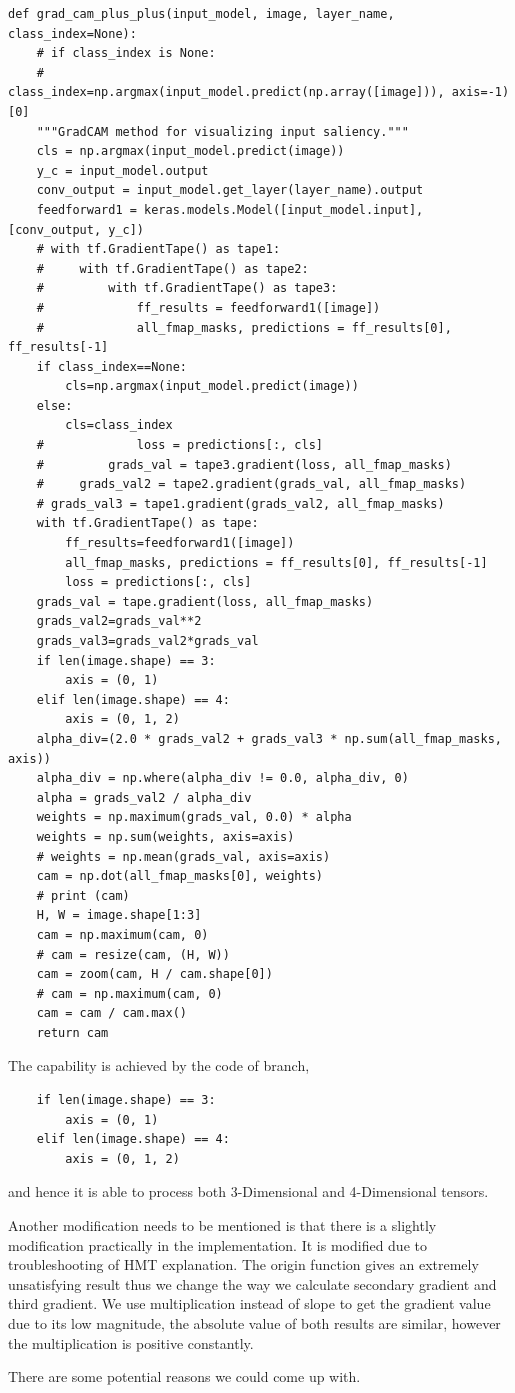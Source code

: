 \documentclass[conference]{IEEEtran}
\begin{document}
\begin{lstlisting}
def grad_cam_plus_plus(input_model, image, layer_name, class_index=None):
    # if class_index is None:
    #     class_index=np.argmax(input_model.predict(np.array([image])), axis=-1)[0]
    """GradCAM method for visualizing input saliency."""
    cls = np.argmax(input_model.predict(image))
    y_c = input_model.output
    conv_output = input_model.get_layer(layer_name).output
    feedforward1 = keras.models.Model([input_model.input], [conv_output, y_c])
    # with tf.GradientTape() as tape1:
    #     with tf.GradientTape() as tape2:
    #         with tf.GradientTape() as tape3:
    #             ff_results = feedforward1([image])
    #             all_fmap_masks, predictions = ff_results[0], ff_results[-1]
    if class_index==None:
        cls=np.argmax(input_model.predict(image))
    else:
        cls=class_index
    #             loss = predictions[:, cls]
    #         grads_val = tape3.gradient(loss, all_fmap_masks)
    #     grads_val2 = tape2.gradient(grads_val, all_fmap_masks)
    # grads_val3 = tape1.gradient(grads_val2, all_fmap_masks)
    with tf.GradientTape() as tape:
        ff_results=feedforward1([image])
        all_fmap_masks, predictions = ff_results[0], ff_results[-1]
        loss = predictions[:, cls]
    grads_val = tape.gradient(loss, all_fmap_masks)
    grads_val2=grads_val**2
    grads_val3=grads_val2*grads_val
    if len(image.shape) == 3:
        axis = (0, 1)
    elif len(image.shape) == 4:
        axis = (0, 1, 2)
    alpha_div=(2.0 * grads_val2 + grads_val3 * np.sum(all_fmap_masks, axis))
    alpha_div = np.where(alpha_div != 0.0, alpha_div, 0)
    alpha = grads_val2 / alpha_div
    weights = np.maximum(grads_val, 0.0) * alpha
    weights = np.sum(weights, axis=axis)
    # weights = np.mean(grads_val, axis=axis)
    cam = np.dot(all_fmap_masks[0], weights)
    # print (cam)
    H, W = image.shape[1:3]
    cam = np.maximum(cam, 0)
    # cam = resize(cam, (H, W))
    cam = zoom(cam, H / cam.shape[0])
    # cam = np.maximum(cam, 0)
    cam = cam / cam.max()
    return cam
\end{lstlisting}

The capability is achieved by the code of branch,
\begin{lstlisting}
    if len(image.shape) == 3:
        axis = (0, 1)
    elif len(image.shape) == 4:
        axis = (0, 1, 2)
\end{lstlisting}
and hence it is able to process both 3-Dimensional and 4-Dimensional tensors.

Another modification needs to be mentioned is that there is a slightly modification practically in the implementation. It is modified due to troubleshooting of HMT explanation. The origin function gives an extremely unsatisfying result thus we change the way we calculate secondary gradient and third gradient. We use multiplication instead of slope to get the gradient value due to its low magnitude, the absolute value of both results are similar, however the multiplication is positive constantly.\par
There are some potential reasons we could come up with.
\end{document}
